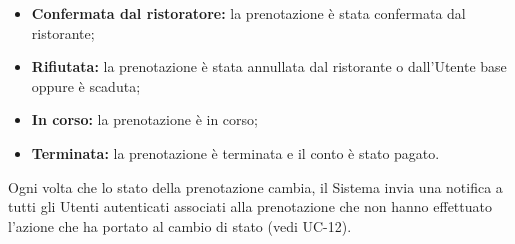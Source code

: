 \begin{itemize}
\begin{itemize}
\begin{itemize}
			            \item \textbf{Confermata dal ristoratore:} la prenotazione è
			                  stata confermata dal ristorante;

			            \item \textbf{Rifiutata:} la prenotazione è
			                  stata annullata dal ristorante o dall'Utente base
			                  oppure è scaduta;

			            \item \textbf{In corso:} la prenotazione è
			                  in corso;

			            \item \textbf{Terminata:} la prenotazione è
			                  terminata e il conto è stato pagato.
		            \end{itemize}

		            Ogni volta che lo stato della prenotazione cambia, il Sistema
		            invia una notifica a tutti gli Utenti autenticati associati alla
		            prenotazione che non hanno effettuato l'azione che ha portato al
		            cambio di stato (vedi UC-12).
	      \end{itemize}

\end{itemize}
